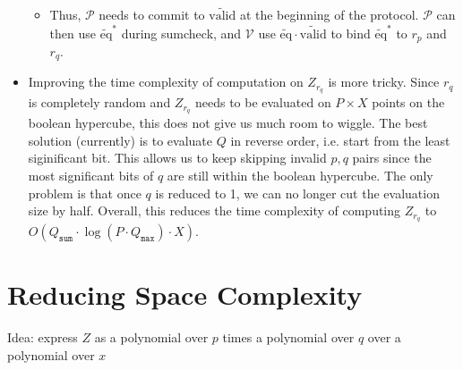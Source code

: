 \documentclass{article}
\newcommand{\Qsum}{Q_{\mathtt{sum}}}
\newcommand{\Qmax}{Q_{\mathtt{max}}}
\renewcommand{\P}{\mathcal{P}}
\newcommand{\V}{\mathcal{V}}
\newcommand{\eq}{\widetilde{\mbox{eq}}}
\newcommand{\valid}{\tilde{\mbox{valid}}}
\begin{document}
\begin{itemize}
\begin{itemize}
        \item Thus, $\P$ needs to commit to $\valid$ at the beginning of the protocol. $\P$ can then use $\eq^*$ during sumcheck, and $\V$ use $\eq \cdot \valid$ to bind $\eq^*$ to $r_p$ and $r_q$.
    \end{itemize}
    \item Improving the time complexity of computation on $Z_{r_q}$ is more tricky. Since $r_q$ is completely random and $Z_{r_q}$ needs to be evaluated on $P \times X$ points on the boolean hypercube, this does not give us much room to wiggle. The best solution (currently) is to evaluate $Q$ in reverse order, i.e. start from the least siginificant bit. This allows us to keep skipping invalid $p, q$ pairs since the most significant bits of $q$ are still within the boolean hypercube. The only problem is that once $q$ is reduced to 1, we can no longer cut the evaluation size by half. Overall, this reduces the time complexity of computing $Z_{r_q}$ to $O(\Qsum\cdot \log(P\cdot\Qmax) \cdot X)$.
\end{itemize}

\section{Reducing Space Complexity}\label{reduce-space}

Idea: express $Z$ as a polynomial over $p$ times a polynomial over $q$ over a polynomial over $x$
\end{document}
